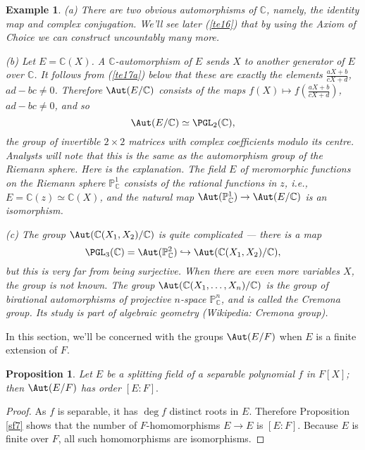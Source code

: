 \documentclass[a4paper,11pt,final,openany]{memoir}
\newtheorem{proposition}[X]{Proposition}
\newtheorem{example}[X]{Example}
\theoremstyle{nonumberplain}
\newtheorem{proof}{Proof.}
\begin{document}
\begin{example}
\label{ft7}(a) There are two obvious automorphisms of $\mathbb{C}$, namely,
the identity map and complex conjugation. We'll see later (\ref{te16}) that by
using the Axiom of Choice we can construct uncountably many more.

(b) Let $E=\mathbb{C}(X)$. A $\mathbb{C}{}$-automorphism of $E{}$ sends $X$ to
another generator of $E$ over $\mathbb{C}{}$. It follows from (\ref{te17a})
below that these are exactly the elements $\frac{aX+b}{cX+d}$, $ad-bc\neq0$.
Therefore $\Aut(E/\mathbb{C})$ consists of the maps $f(X)\mapsto f\left(
\frac{aX+b}{cX+d}\right)  $, $ad-bc\neq0$, and so
\[
\Aut(E/\mathbb{C})\simeq\PGL_{2}(\mathbb{C}),
\]
the group of invertible $2\times2$ matrices with complex coefficients modulo
its centre. Analysts will note that this is the same as the automorphism group
of the Riemann sphere. Here is the explanation. The field $E$ of meromorphic
functions on the Riemann sphere $\mathbb{P}_{\mathbb{C}}^{1}$ consists of the
rational functions in $z$, i.e., $E=\mathbb{C}(z)\simeq\mathbb{C}(X)$, and the
natural map $\Aut(\mathbb{P}_{\mathbb{C}}^{1})\rightarrow\Aut(E/\mathbb{C})$
is an isomorphism.

(c) The group $\Aut(\mathbb{C}(X_{1},X_{2})/\mathbb{C})$ is quite complicated
--- there is a map
\[
\PGL_{3}(\mathbb{C})=\Aut(\mathbb{P}_{\mathbb{C}}^{2})\hookrightarrow
\Aut(\mathbb{C}(X_{1},X_{2})/\mathbb{C}),
\]
but this is very far from being surjective. When there are even more variables
$X$, the group is not known. The group $\Aut(\mathbb{C}(X_{1},\ldots
,X_{n})/\mathbb{C})$ is the group of birational\emph{ } automorphisms of
projective $n$-space $\mathbb{P}_{\mathbb{C}}^{n}$, and is called the
\emph{Cremona group.}%
Its study is part of algebraic geometry (Wikipedia: Cremona group).
\end{example}

In this section, we'll be concerned with the groups $\Aut(E/F)$ when $E$ is a
finite extension of $F$.

\begin{proposition}
\label{ft8} Let $E$ be a splitting field of a separable polynomial $f$ in
$F[X]$; then $\Aut(E/F)$ has order $[E\colon F].$
\end{proposition}

\begin{proof}
As $f$ is separable, it has $\deg f$ distinct roots in $E$. Therefore
Proposition \ref{sf7} shows that the number of $F$-homomorphisms $E\rightarrow
E$ is $[E\colon F]$. Because $E$ is finite over $F$, all such homomorphisms
are isomorphisms.
\end{proof}
\end{document}

